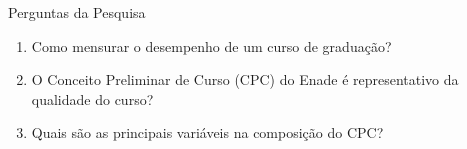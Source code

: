 \documentclass{beamer}
\begin{document}
\begin{frame}{Perguntas da Pesquisa}
	\begin{enumerate}
	\item Como mensurar o desempenho de um curso de graduação?
	\item O Conceito Preliminar de Curso (CPC) do Enade é representativo da qualidade do curso?
	\item Quais são as principais variáveis na composição do CPC?
	\end{enumerate}
\end{frame}
\end{document}
